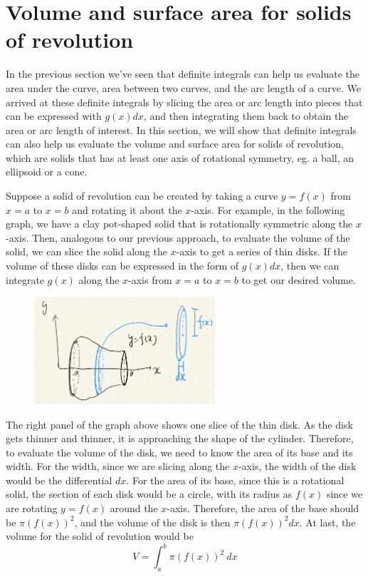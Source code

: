 \section{Volume and surface area for solids of revolution}

In the previous section we've seen that definite integrals can help us evaluate the area under the curve, area between two curves, and the arc length of a curve.  We arrived at these definite integrals by slicing the area or arc length into pieces that can be expressed with $g(x)dx$, and then integrating them back to obtain the area or arc length of interest.  In this section, we will show that definite integrals can also help us evaluate the volume and surface area for solids of revolution, which are solids that has at least one axis of rotational symmetry, eg. a ball, an ellipsoid or a cone. 

Suppose a solid of revolution can be created by taking a curve $y = f(x)$ from $x = a$ to $x = b$ and rotating it about the $x$-axis.  For example, in the following graph, we have a clay pot-shaped solid that is rotationally symmetric along the $x$-axis.  Then, analogous to our previous approach, to evaluate the volume of the solid, we can slice the solid along the $x$-axis to get a series of thin disks.  If the volume of these disks can be expressed in the form of $g(x)dx$, then we can integrate $g(x)$ along the $x$-axis from $x=a$ to $x=b$ to get our desired volume.  

\begin{figure}[ht]
    \centering
    \includegraphics[width = 0.6\textwidth]{figures/chap 07/revolution_vol.png}
\end{figure}

The right panel of the graph above shows one slice of the thin disk.  As the disk gets thinner and thinner, it is approaching the shape of the cylinder.  Therefore, to evaluate the volume of the disk, we need to know the area of its base and its width.  For the width, since we are slicing along the $x$-axis, the width of the disk would be the differential $dx$.  For the area of its base, since this is a rotational solid, the section of each disk would be a circle, with its radius as $f(x)$ since we are rotating $y = f(x)$ around the $x$-axis.  Therefore, the area of the base should be $\pi (f(x))^2$, and the volume of the disk is then $\pi (f(x))^2 dx$.  At last, the volume for the solid of revolution would be
\[V = \int_a^b \pi (f(x))^2~dx\]

